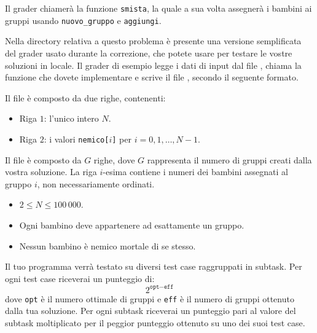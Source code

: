 Il grader chiamerà la funzione \texttt{smista}, la quale a sua volta assegnerà i bambini ai gruppi usando \texttt{nuovo\_gruppo} e \texttt{aggiungi}.



\Grader
Nella directory relativa a questo problema è presente una versione semplificata del grader usato durante la correzione, che potete usare per testare le vostre soluzioni in locale. Il grader di esempio legge i dati di input dal file , chiama la funzione che dovete implementare e scrive il file \outputfile{}, secondo il seguente formato.

Il file  è composto da due righe, contenenti:
\begin{itemize}[nolistsep,itemsep=2mm]
\item Riga $1$: l'unico intero $N$.
\item Riga $2$: i valori \texttt{nemico[$i$]} per $i = 0, 1, \ldots, N-1$.
\end{itemize}

Il file \outputfile{} è composto da $G$ righe, dove $G$ rappresenta il numero di gruppi creati dalla vostra soluzione. La riga $i$-esima contiene i numeri dei bambini assegnati al gruppo $i$, non necessariamente ordinati.


\Constraints



\begin{itemize}[nolistsep, itemsep=2mm]
	\item $2 \le N \le 100\,000$.
	\item Ogni bambino deve appartenere ad esattamente un gruppo.
	\item Nessun bambino è nemico mortale di se stesso.
\end{itemize}



\Scoring
Il tuo programma verrà testato su diversi test case raggruppati in subtask. Per ogni test case riceverai un punteggio di:
\[
2^{\texttt{opt}-\texttt{eff}}
\]
dove \texttt{opt} è il numero ottimale di gruppi e \texttt{eff} è il numero di gruppi ottenuto dalla tua soluzione. Per ogni subtask riceverai un punteggio pari al valore del subtask moltiplicato per il peggior punteggio ottenuto su uno dei suoi test case.

